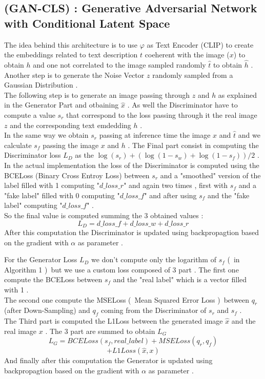\subsection*{(GAN-CLS) :  Generative Adversarial Network with Conditional Latent Space }
The idea behind this architecture is to use $\varphi$ as Text Encoder (CLIP)
to create the embeddings related to text description ${t}$ coeherent with the image (${x}$) 
to obtain ${h}$ and one not correlated to the image sampled randomly $\hat{t}$ to obtain $\hat{h}$ .
Another step is to generate the Noise Vector ${z}$ randomly sampled from a Gaussian 
Distribution . \\
The following step is to generate an image passing through ${z}$ and ${h}$ as explained 
in the Generator Part and otbaining $\hat{x}$ .
As well the Discriminator have to compute a value ${s_r}$ that correspond to 
the loss passing through it the real image ${z}$ and the corresponding text 
emdedding ${h}$ . \\
In the same way we obtain ${s_r}$ passing at inference time 
the image ${x}$ and $\hat{t}$ and we calculate 
${s_f}$ passing the image ${x}$ and ${h}$ . 
The Final part consist in computing the Discriminator loss $L_D$ as the 
$\log(s_r) + \left(\log(1 - s_w) + \log(1 - s_f)\right) / 2$ . \\
In the actual implementation the loss of the Discriminator is computed 
using the BCELoss (Binary Cross Entroy Loss) between ${s_r}$ and a 
"smoothed" version of the label filled with 1 computing "${d\_loss\_r}$" and again two times , first 
with ${s_f}$ and a "fake label" filled with 0 computing "${d\_loss\_f}$" and after using 
${s_f}$ and the "fake label" computing "${d\_loss\_f}$" . \\
So the final value is computed summing the 3 obtained values :
\[
 L_D = d\_loss\_f + d\_loss\_w + d\_loss\_r
\]
After this computation the Discriminator is updated using backpropagtion 
based on the gradient with $\alpha$ as parameter .

For the Generator Loss $L_D$ we don't compute only the logarithm
of ${s_f}$ (\ in Algorithm 1 )\ but we use a custom loss composed of 3 part .
The first one compute the BCELoss between ${s_f}$ and the "real label" which is
a vector filled with 1 . \\
The second one compute the MSELoss (\ Mean Squared Error Loss )\ between 
${q_r}$ (after Down-Sampling) and ${q_f}$ coming from the Discriminator of
${s_r}$ and ${s_f}$ . \\
The Third part is computed the L1Loss between the generated image $\hat{x}$
and the real image ${x}$ .
The 3 part are summed to obtain $L_G$
\[
 L_G = BCELoss( s_f,real\_label ) + MSELoss( q_r , q_f ) 
\]
\[
 + L1Loss(\hat{x},x)
\]
And finally after this computation the Generator is updated using backpropagtion 
based on the gradient with $\alpha$ as parameter .



